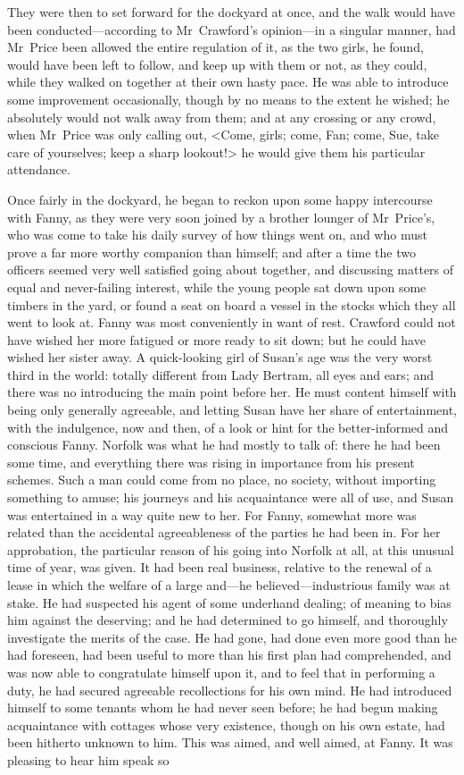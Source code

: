 They were then to set forward for the dockyard at once, and the walk would have been conducted—according to Mr~Crawford's opinion—in a singular manner, had Mr~Price been allowed the entire regulation of it, as the two girls, he found, would have been left to follow, and keep up with them or not, as they could, while they walked on together at their own hasty pace. He was able to introduce some improvement occasionally, though by no means to the extent he wished; he absolutely would not walk away from them; and at any crossing or any crowd, when Mr~Price was only calling out, <Come, girls; come, Fan; come, Sue, take care of yourselves; keep a sharp lookout!> he would give them his particular attendance.

Once fairly in the dockyard, he began to reckon upon some happy intercourse with Fanny, as they were very soon joined by a brother lounger of Mr~Price's, who was come to take his daily survey of how things went on, and who must prove a far more worthy companion than himself; and after a time the two officers seemed very well satisfied going about together, and discussing matters of equal and never-failing interest, while the young people sat down upon some timbers in the yard, or found a seat on board a vessel in the stocks which they all went to look at. Fanny was most conveniently in want of rest. Crawford could not have wished her more fatigued or more ready to sit down; but he could have wished her sister away. A quick-looking girl of Susan's age was the very worst third in the world: totally different from Lady Bertram, all eyes and ears; and there was no introducing the main point before her. He must content himself with being only generally agreeable, and letting Susan have her share of entertainment, with the indulgence, now and then, of a look or hint for the better-informed and conscious Fanny. Norfolk was what he had mostly to talk of: there he had been some time, and everything there was rising in importance from his present schemes. Such a man could come from no place, no society, without importing something to amuse; his journeys and his acquaintance were all of use, and Susan was entertained in a way quite new to her. For Fanny, somewhat more was related than the accidental agreeableness of the parties he had been in. For her approbation, the particular reason of his going into Norfolk at all, at this unusual time of year, was given. It had been real business, relative to the renewal of a lease in which the welfare of a large and—he believed—industrious family was at stake. He had suspected his agent of some underhand dealing; of meaning to bias him against the deserving; and he had determined to go himself, and thoroughly investigate the merits of the case. He had gone, had done even more good than he had foreseen, had been useful to more than his first plan had comprehended, and was now able to congratulate himself upon it, and to feel that in performing a duty, he had secured agreeable recollections for his own mind. He had introduced himself to some tenants whom he had never seen before; he had begun making acquaintance with cottages whose very existence, though on his own estate, had been hitherto unknown to him. This was aimed, and well aimed, at Fanny. It was pleasing to hear him speak so 